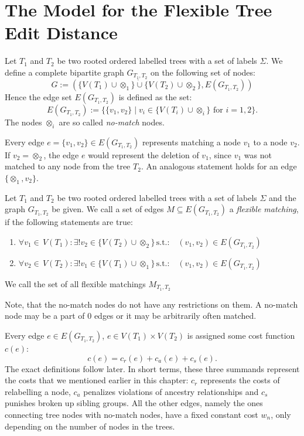 \section{The Model for the Flexible Tree Edit Distance}
\begin{defin}\label{def:graph_fted}
Let $T_1$ and $T_2$ be two rooted ordered labelled trees with a set of labels $\Sigma$. We define a complete bipartite graph $G_{T_1,T_2}$ on the following set of nodes:\\
$$G := (\{V(T_1)\cup \otimes_1\} \dot{\cup} \{V(T_2)\cup \otimes_2\}, E(G_{T_1,T_2}))$$
Hence the edge set $E(G_{T_1,T_2})$ is defined as the set: 
$$E(G_{T_1,T_2}):=\{\{v_1,v_2\} \;|\; v_i \in\{V(T_i)\cup \otimes_i\}\text{ for }i =1,2\}.$$
The nodes $\otimes_i$ are so called \textit{no-match} nodes.
\end{defin}
\begin{rem}
Every edge $e=\{v_1,v_2\}\in E(G_{T_1,T_2})$ represents matching a node $v_1$ to a node $v_2$. If $v_2=\otimes_2$, the edge $e$ would represent the deletion of $v_1$, since $v_1$ was not matched to any node from the tree $T_2$. An analogous statement holds for an edge $\{\otimes_1,v_2\}$. 
\end{rem}
\begin{defin}
Let $T_1$ and $T_2$ be two rooted ordered labelled trees with a set of labels $\Sigma$ and the graph $G_{T_1, T_2}$ be given. We call a set of edges $M \subseteq E(G_{T_1,T_2})$ a \textit{flexible matching}, if the following statements are true:
\begin{enumerate}
\item $\forall v_1 \in \, V(T_1): \exists !v_2 \in \{V(T_2)\cup \otimes_2\} \, \text{s.t.:} \quad (v_1, v_2) \in E(G_{T_1,T_2})$
\item $\forall v_2 \in \, V(T_2): \exists !v_1 \in \{V(T_1)\cup \otimes_1\} \, \text{s.t.:} \quad (v_1, v_2) \in E(G_{T_1,T_2})$
\end{enumerate}
We call the set of all flexible matchings $M_{T_1, T_2}$
\end{defin}
\begin{rem}
Note, that the no-match nodes do not have any restrictions on them. A no-match node may be a part of $0$ edges or it may be arbitrarily often matched. 
\end{rem}
Every edge $e \in E(G_{T_1,T_2})$, $e \in V(T_1) \times V(T_2)$ is assigned some cost function $c(e)$:
\begin{equation}\label{eq:edgeCost}
c(e) = c_r(e) + c_a(e) + c_s(e).
\end{equation} 
The exact definitions follow later. In short terms, these three summands represent the costs that we mentioned earlier in this chapter: $c_r$ represents the costs of relabelling a node, $c_a$ penalizes violations of ancestry relationships and $c_s$ punishes broken up sibling groups. All the other edges, namely the ones connecting tree nodes with no-match nodes, have a fixed constant cost $w_n$, only depending on the number of nodes in the trees.

